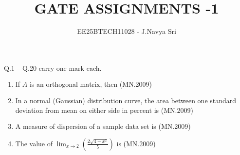 \documentclass[journal]{IEEEtran}
\numberwithin{equation}{enumi}
\numberwithin{figure}{enumi}
\begin{document}

\vspace{3cm}

\title{GATE ASSIGNMENTS -1}
\author{EE25BTECH11028 - J.Navya Sri}
\date{}
\maketitle

\noindent
Q.1 -- Q.20 carry one mark each.

\begin{enumerate}
\item If $A$ is an orthogonal matrix, then
\hfill(MN.2009)

\begin{enumerate}[label=(\Alph*)]
\end{enumerate}

\item In a normal (Gaussian) distribution curve, the area between one standard deviation from mean on either side in percent is
\hfill{(MN.2009)}
\begin{enumerate}[label=(\Alph*)]
\end{enumerate}

\item A measure of dispersion of a sample data set is
\hfill{(MN.2009)}
\begin{enumerate}[label=(\Alph*)]
\end{enumerate}

\item The value of $\displaystyle \lim_{x \to 2} \left(\frac{2\sqrt{4-x^2}}{5}\right)$ is
\hfill{(MN.2009)}
\begin{enumerate}[label=(\Alph*)]
\end{enumerate}


\end{enumerate}
\end{document}
